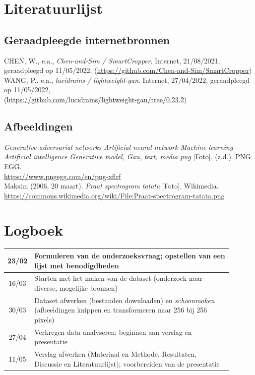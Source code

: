 \documentclass[dutch, twoside, a4paper, 10pt]{article}
\begin{document}
\begin{table}[H]
\begin{tabular}{c p{0.6\linewidth}}
    \end{tabular}
\end{table}
\section{Literatuurlijst}
\subsection{Geraadpleegde internetbronnen}
CHEN, W., e.a., \textit{Chen-and-Sim / SmartCropper}. Internet, 21/08/2021, geraadpleegd op 11/05/2022, (\underline{\url{https://github.com/Chen-and-Sim/SmartCropper}})\\
WANG, P., e.a., \textit{lucidrains / lightweight-gan}. Internet, 27/04/2022, geraadpleegd op 11/05/2022,\\ (\underline{\url{https://github.com/lucidrains/lightweight-gan/tree/0.23.2}})
\subsection{Afbeeldingen}
\textit{Generative adversarial networks Artificial neural network Machine learning Artificial intelligence Generative model, Gan, text, media png} [Foto]. (z.d.). PNG EGG. \\ \underline{\url{https://www.pngegg.com/en/png-xflrf}}\\
Maksim (2006, 20 maart). \textit{Praat spectrogram tatata} [Foto]. Wikimedia. \\ \underline{\url{https://commons.wikimedia.org/wiki/File:Praat-spectrogram-tatata.png}}
\section{Logboek}
\renewcommand{\arraystretch}{1.5}
\begin{table}[h!]
\centering
\begin{tabular}{|c|p{0.9\linewidth}|}
    \hline
    23/02 & Formuleren van de onderzoeksvraag; opstellen van een lijst met benodigdheden \\
    \hline
     16/03 & Starten met het maken van de dataset (onderzoek naar diverse, mogelijke bronnen)  \\
     \hline
     30/03 & Dataset afwerken (bestanden downloaden) en \textit{schoonmaken} (afbeeldingen knippen en transformeren naar 256 bij 256 pixels) \\
     \hline
     27/04 & Verkregen data analyseren; beginnen aan verslag en presentatie\\
     \hline
     11/05 & Verslag afwerken (Materiaal en Methode, Resultaten, Discussie en Literatuurlijst); voorbereiden van de presentatie\\
     \hline
\end{tabular}
\end{table}
\end{document}
